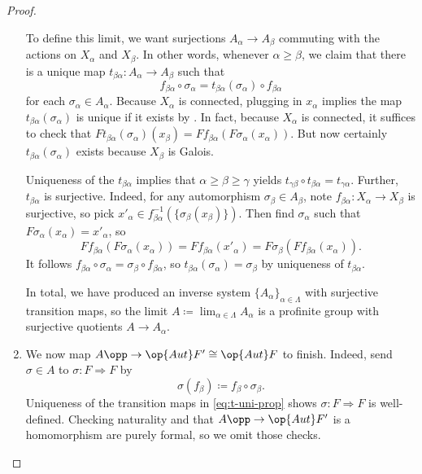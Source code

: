 \documentclass{amsart}
\begin{document}
\begin{proof}
\begin{enumerate}
        To define this limit, we want surjections $A_\alpha\to A_\beta$ commuting with the actions on $X_\alpha$ and $X_\beta$. In other words, whenever $\alpha\ge\beta$, we claim that there is a unique map $t_{\beta\alpha}\colon A_\alpha\to A_\beta$ such that
        \begin{equation}
            f_{\beta\alpha}\circ\sigma_\alpha=t_{\beta\alpha}(\sigma_\alpha)\circ f_{\beta\alpha} \label{eq:t-uni-prop}
        \end{equation}
        for each $\sigma_\alpha\in A_\alpha$. Because $X_\alpha$ is connected, plugging in $x_\alpha$ implies the map $t_{\beta\alpha}(\sigma_\alpha)$ is unique if it exists by . In fact, because $X_\alpha$ is connected, it suffices to check that $Ft_{\beta\alpha}(\sigma_\alpha)(x_\beta)=Ff_{\beta\alpha}(F\sigma_\alpha(x_\alpha))$. But now certainly $t_{\beta\alpha}(\sigma_\alpha)$ exists because $X_\beta$ is Galois.

        Uniqueness of the $t_{\beta\alpha}$ implies that $\alpha\ge\beta\ge\gamma$ yields $t_{\gamma\beta}\circ t_{\beta\alpha}=t_{\gamma\alpha}$. Further, $t_{\beta\alpha}$ is surjective. Indeed, for any automorphism $\sigma_\beta\in A_\beta$, note $f_{\beta\alpha}\colon X_\alpha\to X_\beta$ is surjective, so pick $x'_\alpha\in f_{\beta\alpha}^{-1}(\{\sigma_\beta(x_\beta)\})$. Then find $\sigma_\alpha$ such that $F\sigma_\alpha(x_\alpha)=x'_\alpha$, so
        \[Ff_{\beta\alpha}(F\sigma_\alpha(x_\alpha))=Ff_{\beta\alpha}(x'_\alpha)=F\sigma_\beta(Ff_{\beta\alpha}(x_\alpha)).\]
        It follows $f_{\beta\alpha}\circ\sigma_\alpha=\sigma_\beta\circ f_{\beta\alpha}$, so $t_{\beta\alpha}(\sigma_\alpha)=\sigma_\beta$ by uniqueness of $t_{\beta\alpha}$.

        In total, we have produced an inverse system $\{A_\alpha\}_{\alpha\in\Lambda}$ with surjective transition maps, so the limit $A\coloneqq\lim_{\alpha\in\Lambda}A_\alpha$ is a profinite group with surjective quotients $A\to A_\alpha$.

        \item We now map $A\opp\to\op{Aut}F'\cong\op{Aut}F$ to finish. Indeed, send $\sigma\in A$ to $\sigma\colon F\Rightarrow F$ by
        \[\sigma(f_\beta)\coloneqq f_\beta\circ\sigma_\beta.\]
        Uniqueness of the transition maps in \eqref{eq:t-uni-prop} shows $\sigma\colon F\Rightarrow F$ is well-defined. Checking naturality and that $A\opp\to\op{Aut}F'$ is a homomorphism are purely formal, so we omit those checks.


\end{enumerate}
\end{proof}
\end{document}
